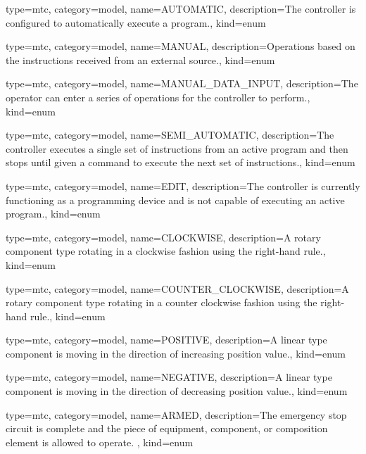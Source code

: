 {
  type=mtc,
  category=model,
  name={AUTOMATIC},
  description={The \gls{controller} is configured to automatically execute a program.},
  kind={enum}
}


{
  type=mtc,
  category=model,
  name={MANUAL},
  description={Operations based on the instructions received from an external source.},
  kind={enum}
}


{
  type=mtc,
  category=model,
  name={MANUAL\_DATA\_INPUT},
  description={The operator can enter a series of operations for the controller to perform.},
  kind={enum}
}


{
  type=mtc,
  category=model,
  name={SEMI\_AUTOMATIC},
  description={The controller  executes a single set of instructions from an active program and then stops until given a command to execute the next set of instructions.},
  kind={enum}
}


{
  type=mtc,
  category=model,
  name={EDIT},
  description={The controller is currently functioning as a programming device and is not capable of executing an active program.},
  kind={enum}
}


{
  type=mtc,
  category=model,
  name={CLOCKWISE},
  description={A \gls{rotary} component type rotating in a clockwise fashion using the right-hand rule.},
  kind={enum}
}


{
  type=mtc,
  category=model,
  name={COUNTER\_CLOCKWISE},
  description={A \gls{rotary} component type rotating in a counter clockwise fashion using the right-hand rule.},
  kind={enum}
}


{
  type=mtc,
  category=model,
  name={POSITIVE},
  description={A \gls{linear} type component is moving in the direction of increasing position value.},
  kind={enum}
}


{
  type=mtc,
  category=model,
  name={NEGATIVE},
  description={A \gls{linear} type component is moving in the direction of decreasing position value.},
  kind={enum}
}


{
  type=mtc,
  category=model,
  name={ARMED},
  description={The emergency stop circuit is complete and the piece of equipment, component, or composition element is allowed to operate. },
  kind={enum}
}



